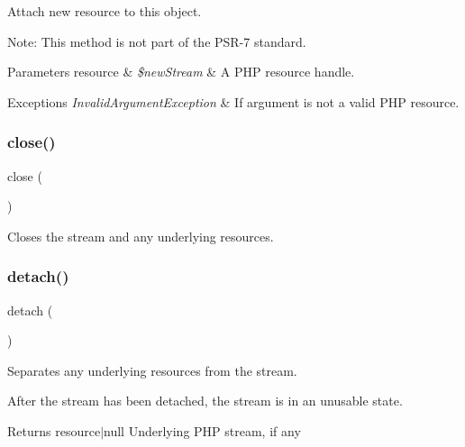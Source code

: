 Attach new resource to this object.

Note\+: This method is not part of the P\+S\+R-\/7 standard.


\begin{DoxyParams}[1]{Parameters}
resource & {\em \$new\+Stream} & A P\+HP resource handle.\\
\hline
\end{DoxyParams}

\begin{DoxyExceptions}{Exceptions}
{\em Invalid\+Argument\+Exception} & If argument is not a valid P\+HP resource. \\
\hline
\end{DoxyExceptions}
\mbox{\label{class_pes_1_1_http_1_1_stream_aa69c8bf1f1dcf4e72552efff1fe3e87e}} 
\subsubsection{\texorpdfstring{close()}{close()}}
{\footnotesize\ttfamily close (\begin{DoxyParamCaption}{ }\end{DoxyParamCaption})}

Closes the stream and any underlying resources. \mbox{\label{class_pes_1_1_http_1_1_stream_aa4c7e8ce5147b0a22d6f2543c017a937}} 
\subsubsection{\texorpdfstring{detach()}{detach()}}
{\footnotesize\ttfamily detach (\begin{DoxyParamCaption}{ }\end{DoxyParamCaption})}

Separates any underlying resources from the stream.

After the stream has been detached, the stream is in an unusable state.

\begin{DoxyReturn}{Returns}
resource$\vert$null Underlying P\+HP stream, if any 
\end{DoxyReturn}
\mbox{\label{class_pes_1_1_http_1_1_stream_ada3799f740f09e3689d0054629e87feb}} 

